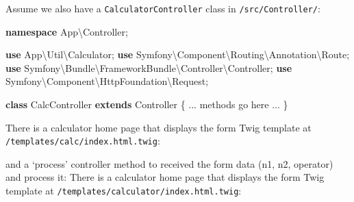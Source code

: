 \documentclass[a4paperpaper,openright]{book}
\newenvironment{Shaded}{}{}
\newcommand{\CommentTok}[1]{\textcolor[rgb]{0.38,0.63,0.69}{\textit{#1}}}
\newcommand{\KeywordTok}[1]{\textcolor[rgb]{0.00,0.44,0.13}{\textbf{#1}}}
\newcommand{\NormalTok}[1]{#1}
\newcommand{\OtherTok}[1]{\textcolor[rgb]{0.00,0.44,0.13}{#1}}
\newcommand{\StringTok}[1]{\textcolor[rgb]{0.25,0.44,0.63}{#1}}
\begin{document}
Assume we also have a \texttt{CalculatorController} class in
\texttt{/src/Controller/}:

\begin{Shaded}
\begin{Highlighting}[]
    \KeywordTok{namespace}\NormalTok{ App\textbackslash{}Controller}\OtherTok{;}

    \KeywordTok{use}\NormalTok{ App\textbackslash{}Util\textbackslash{}Calculator}\OtherTok{;}
    \KeywordTok{use}\NormalTok{ Symfony\textbackslash{}Component\textbackslash{}Routing\textbackslash{}Annotation\textbackslash{}Route}\OtherTok{;}
    \KeywordTok{use}\NormalTok{ Symfony\textbackslash{}Bundle\textbackslash{}FrameworkBundle\textbackslash{}Controller\textbackslash{}Controller}\OtherTok{;}
    \KeywordTok{use}\NormalTok{ Symfony\textbackslash{}Component\textbackslash{}HttpFoundation\textbackslash{}Request}\OtherTok{;}

    \KeywordTok{class}\NormalTok{ CalcController }\KeywordTok{extends}\NormalTok{ Controller}
\NormalTok{    \{}
        \StringTok{...}\NormalTok{ methods go here }\StringTok{...}
\NormalTok{    \}}
\end{Highlighting}
\end{Shaded}

There is a calculator home page that displays the form Twig template at
\texttt{/templates/calc/index.html.twig}:

\begin{Shaded}
\end{Shaded}

and a `process' controller method to received the form data (n1, n2,
operator) and process it: There is a calculator home page that displays
the form Twig template at
\texttt{/templates/calculator/index.html.twig}:
\end{document}
